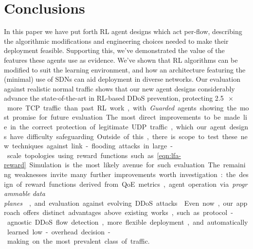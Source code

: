 \documentclass[10pt, times, conference, letterpaper]{IEEEtran}
\begin{document}

\section{Conclusions}
In this paper we have put forth RL agent designs which act per-flow, describing the algorithmic modifications and engineering choices needed to make their deployment feasible.
Supporting this, we've demonstrated the value of the features these agents use as evidence.
We've shown that RL algorithms can be modified to suit the learning environment, and how an architecture featuring the (minimal) use of SDNs can aid deployment in diverse networks.
Our evaluation against realistic normal traffic shows that our new agent designs considerably advance the state-of-the-art in RL-based DDoS prevention, protecting \SI{2.5}{$\!\times$} more TCP traffic than past RL work, with \emph{Guarded} agents showing the most promise for future evaluation.

The most direct improvements to be made lie in the correct protection of legitimate UDP traffic, which our agent designs have difficulty safeguarding.
Outside of this, there is scope to test these new techniques against link-flooding attacks in large-scale topologies using reward functions such as \cref{eqn:lfa-reward}.
Simulation is the most likely avenue for such evaluation.
The remaining weaknesses invite many further improvements worth investigation: the design of reward functions derived from QoE metrics, agent operation via \emph{programmable data planes} \cite{DBLP:conf/ancs/JouetP17}, and evaluation against evolving DDoS attacks \cite{DBLP:conf/spw/KangGS16}.
Even now, our approach offers distinct advantages above existing works, such as protocol-agnostic DDoS flow detection, more flexible deployment, and automatically learned low-overhead decision-making on the most prevalent class of traffic.

\end{document}
